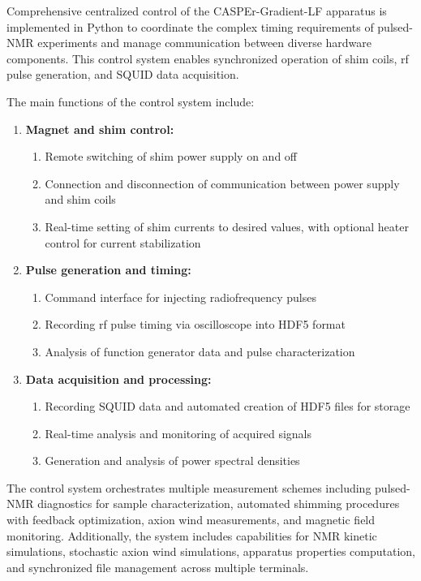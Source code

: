 Comprehensive centralized control of the CASPEr-Gradient-LF apparatus is implemented in Python to coordinate the complex timing requirements of pulsed-NMR experiments and manage communication between diverse hardware components.
This control system enables synchronized operation of shim coils, rf pulse generation, and SQUID data acquisition.

The main functions of the control system include:

\begin{enumerate}
    \item \textbf{Magnet and shim control:}
    \begin{enumerate}
        \item Remote switching of shim power supply on and off
        \item Connection and disconnection of communication between power supply and shim coils
        \item Real-time setting of shim currents to desired values, with optional heater control for current stabilization
    \end{enumerate}
    \item \textbf{Pulse generation and timing:}
    \begin{enumerate}
        \item Command interface for injecting radiofrequency pulses
        \item Recording rf pulse timing via oscilloscope into HDF5 format
        \item Analysis of function generator data and pulse characterization
    \end{enumerate}
    \item \textbf{Data acquisition and processing:}
    \begin{enumerate}
        \item Recording SQUID data and automated creation of HDF5 files for storage
        \item Real-time analysis and monitoring of acquired signals
        \item Generation and analysis of power spectral densities
    \end{enumerate}
\end{enumerate}

The control system orchestrates multiple measurement schemes including pulsed-NMR diagnostics for sample characterization, automated shimming procedures with feedback optimization, axion wind measurements, and magnetic field monitoring.
Additionally, the system includes capabilities for NMR kinetic simulations, stochastic axion wind simulations, apparatus properties computation, and synchronized file management across multiple terminals.


